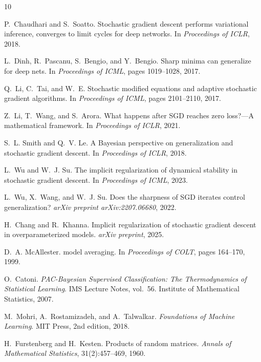\documentclass[11pt,a4paper]{article}
\theoremstyle{definition}
\theoremstyle{remark}
\begin{document}
\begin{thebibliography}{10}

P.~Chaudhari and S.~Soatto.
\newblock Stochastic gradient descent performs variational inference, converges to
  limit cycles for deep networks.
\newblock In \emph{Proceedings of ICLR}, 2018.

L.~Dinh, R.~Pascanu, S.~Bengio, and Y.~Bengio.
\newblock Sharp minima can generalize for deep nets.
\newblock In \emph{Proceedings of ICML}, pages 1019--1028, 2017.

Q.~Li, C.~Tai, and W.~E.
\newblock Stochastic modified equations and adaptive stochastic gradient algorithms.
\newblock In \emph{Proceedings of ICML}, pages 2101--2110, 2017.

Z.~Li, T.~Wang, and S.~Arora.
\newblock What happens after {SGD} reaches zero loss?---{A} mathematical framework.
\newblock In \emph{Proceedings of ICLR}, 2021.

S.~L. Smith and Q.~V. Le.
\newblock A {B}ayesian perspective on generalization and stochastic gradient descent.
\newblock In \emph{Proceedings of ICLR}, 2018.

L.~Wu and W.~J. Su.
\newblock The implicit regularization of dynamical stability in stochastic gradient
  descent.
\newblock In \emph{Proceedings of ICML}, 2023.

L.~Wu, X.~Wang, and W.~J. Su.
\newblock Does the sharpness of SGD iterates control generalization?
\newblock \emph{arXiv preprint arXiv:2207.06680}, 2022.

H.~Chang and R.~Khanna.
\newblock Implicit regularization of stochastic gradient descent in overparameterized
  models.
\newblock \emph{arXiv preprint}, 2025.

D.~A. McAllester.
 model averaging.
\newblock In \emph{Proceedings of COLT}, pages 164--170, 1999.

O.~Catoni.
\newblock \emph{{PAC-Bayesian} Supervised Classification: The Thermodynamics of
  Statistical Learning}.
\newblock IMS Lecture Notes, vol.~56. Institute of Mathematical Statistics, 2007.

M.~Mohri, A.~Rostamizadeh, and A.~Talwalkar.
\newblock \emph{Foundations of Machine Learning}.
\newblock MIT Press, 2nd edition, 2018.

H.~Furstenberg and H.~Kesten.
\newblock Products of random matrices.
\newblock \emph{Annals of Mathematical Statistics}, 31(2):457--469, 1960.

\end{thebibliography}
\end{document}
